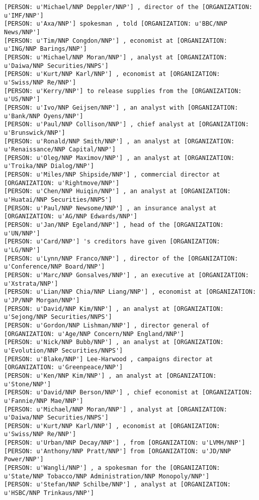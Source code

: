 \documentclass[12pt]{report}
\begin{document}
\begin{scriptsize}
\begin{verbatim}
[PERSON: u'Michael/NNP Deppler/NNP'] , director of the [ORGANIZATION: u'IMF/NNP']
[PERSON: u'Axa/NNP'] spokesman , told [ORGANIZATION: u'BBC/NNP News/NNP']
[PERSON: u'Tim/NNP Congdon/NNP'] , economist at [ORGANIZATION: u'ING/NNP Barings/NNP']
[PERSON: u'Michael/NNP Moran/NNP'] , analyst at [ORGANIZATION: u'Daiwa/NNP Securities/NNPS']
[PERSON: u'Kurt/NNP Karl/NNP'] , economist at [ORGANIZATION: u'Swiss/NNP Re/NNP']
[PERSON: u'Kerry/NNP'] to release supplies from the [ORGANIZATION: u'US/NNP']
[PERSON: u'Ivo/NNP Geijsen/NNP'] , an analyst with [ORGANIZATION: u'Bank/NNP Oyens/NNP']
[PERSON: u'Paul/NNP Collison/NNP'] , chief analyst at [ORGANIZATION: u'Brunswick/NNP']
[PERSON: u'Ronald/NNP Smith/NNP'] , an analyst at [ORGANIZATION: u'Renaissance/NNP Capital/NNP']
[PERSON: u'Oleg/NNP Maximov/NNP'] , an analyst at [ORGANIZATION: u'Troika/NNP Dialog/NNP']
[PERSON: u'Miles/NNP Shipside/NNP'] , commercial director at [ORGANIZATION: u'Rightmove/NNP']
[PERSON: u'Chen/NNP Huiqin/NNP'] , an analyst at [ORGANIZATION: u'Huatai/NNP Securities/NNPS']
[PERSON: u'Paul/NNP Newsome/NNP'] , an insurance analyst at [ORGANIZATION: u'AG/NNP Edwards/NNP']
[PERSON: u'Jan/NNP Egeland/NNP'] , head of the [ORGANIZATION: u'UN/NNP']
[PERSON: u'Card/NNP'] 's creditors have given [ORGANIZATION: u'LG/NNP']
[PERSON: u'Lynn/NNP Franco/NNP'] , director of the [ORGANIZATION: u'Conference/NNP Board/NNP']
[PERSON: u'Marc/NNP Gonsalves/NNP'] , an executive at [ORGANIZATION: u'Xstrata/NNP']
[PERSON: u'Lian/NNP Chia/NNP Liang/NNP'] , economist at [ORGANIZATION: u'JP/NNP Morgan/NNP']
[PERSON: u'David/NNP Kim/NNP'] , an analyst at [ORGANIZATION: u'Sejong/NNP Securities/NNPS']
[PERSON: u'Gordon/NNP Lishman/NNP'] , director general of [ORGANIZATION: u'Age/NNP Concern/NNP England/NNP']
[PERSON: u'Nick/NNP Bubb/NNP'] , an analyst at [ORGANIZATION: u'Evolution/NNP Securities/NNPS']
[PERSON: u'Blake/NNP'] Lee-Harwood , campaigns director at [ORGANIZATION: u'Greenpeace/NNP']
[PERSON: u'Ken/NNP Kim/NNP'] , an analyst at [ORGANIZATION: u'Stone/NNP']
[PERSON: u'David/NNP Berson/NNP'] , chief economist at [ORGANIZATION: u'Fannie/NNP Mae/NNP']
[PERSON: u'Michael/NNP Moran/NNP'] , analyst at [ORGANIZATION: u'Daiwa/NNP Securities/NNPS']
[PERSON: u'Kurt/NNP Karl/NNP'] , economist at [ORGANIZATION: u'Swiss/NNP Re/NNP']
[PERSON: u'Urban/NNP Decay/NNP'] , from [ORGANIZATION: u'LVMH/NNP']
[PERSON: u'Anthony/NNP Pratt/NNP'] from [ORGANIZATION: u'JD/NNP Power/NNP']
[PERSON: u'Wangli/NNP'] , a spokesman for the [ORGANIZATION: u'State/NNP Tobacco/NNP Administration/NNP Monopoly/NNP']
[PERSON: u'Stefan/NNP Schilbe/NNP'] , analyst at [ORGANIZATION: u'HSBC/NNP Trinkaus/NNP']

\end{verbatim}
\end{scriptsize}
\end{document}
